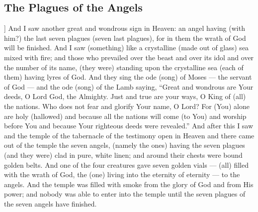 \begin{pages}
\begin{Leftside}
        			\chapter{The Plagues of the Angels}
				]		
		And I saw another great and wondrous sign in Heaven: an angel having (with him?) the last seven plagues (seven last plagues), for in them the wrath of God will be finished. And I saw (something) like a crystalline (made out of glass) sea mixed with fire; and those who prevailed over the beast and over its idol and over the number of its name, (they were) standing upon the crystalline sea (each of them) having lyres of God. 
		\pend
		\pstart
		And they sing the ode (song) of Moses — the servant of God — and the ode (song) of the Lamb saying, “Great and wondrous are Your deeds, O Lord God, the Almighty. Just and true are your ways, O King of (all) the nations. Who does not fear and glorify Your name, O Lord? For (You) alone are holy (hallowed) and because all the nations will come (to You) and worship before You and because Your righteous deeds were revealed.”
		\pend
		\pstart
		And after this I saw and the temple of the tabernacle of the testimony open in Heaven and there came out of the temple the seven angels, (namely the ones) having the seven plagues (and they were) clad in pure, white linen; and around their chests were bound golden belts. And one of the four creatures gave seven golden vials — (all) filled with the wrath of God, the (one) living into the eternity of eternity — to the angels. And the temple was filled with smoke from the glory of God and from His power; and nobody was able to enter into the temple until the seven plagues of the seven angels have finished. 
		\pend
        \endnumbering
    \end{Leftside}

\end{pages} 
\Pages

